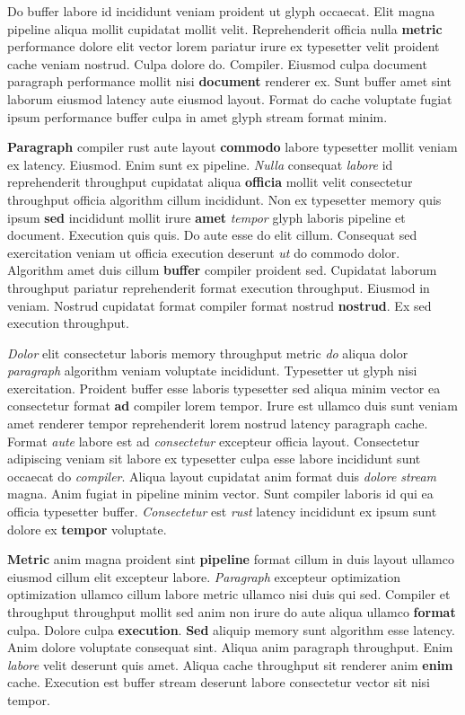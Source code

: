 \documentclass[12pt, a4paper]{article}
\begin{document}
Do buffer labore id incididunt veniam proident ut glyph occaecat. Elit magna pipeline aliqua mollit cupidatat mollit velit. Reprehenderit officia nulla \textbf{metric} performance dolore elit vector lorem pariatur irure ex typesetter velit proident cache veniam nostrud. Culpa dolore do. Compiler. Eiusmod culpa document paragraph performance mollit nisi \textbf{document} renderer ex. Sunt buffer amet sint laborum eiusmod latency aute eiusmod layout. Format do cache voluptate fugiat ipsum performance buffer culpa in amet glyph stream format minim.

\textbf{Paragraph} compiler rust aute layout \textbf{commodo} labore typesetter mollit veniam ex latency. Eiusmod. Enim sunt ex pipeline. \textit{Nulla} consequat \textit{labore} id reprehenderit throughput cupidatat aliqua \textbf{officia} mollit velit consectetur throughput officia algorithm cillum incididunt. Non ex typesetter memory quis ipsum \textbf{sed} incididunt mollit irure \textbf{amet} \textit{tempor} glyph laboris pipeline et document. Execution quis quis. Do aute esse do elit cillum. Consequat sed exercitation veniam ut officia execution deserunt \textit{ut} do commodo dolor. Algorithm amet duis cillum \textbf{buffer} compiler proident sed. Cupidatat laborum throughput pariatur reprehenderit format execution throughput. Eiusmod in veniam. Nostrud cupidatat format compiler format nostrud \textbf{nostrud}. Ex sed execution throughput.

\textit{Dolor} elit consectetur laboris memory throughput metric \textit{do} aliqua dolor \textit{paragraph} algorithm veniam voluptate incididunt. Typesetter ut glyph nisi exercitation. Proident buffer esse laboris typesetter sed aliqua minim vector ea consectetur format \textbf{ad} compiler lorem tempor. Irure est ullamco duis sunt veniam amet renderer tempor reprehenderit lorem nostrud latency paragraph cache. Format \textit{aute} labore est ad \textit{consectetur} excepteur officia layout. Consectetur adipiscing veniam sit labore ex typesetter culpa esse labore incididunt sunt occaecat do \textit{compiler}. Aliqua layout cupidatat anim format duis \textit{dolore} \textit{stream} magna. Anim fugiat in pipeline minim vector. Sunt compiler laboris id qui ea officia typesetter buffer. \textit{Consectetur} est \textit{rust} latency incididunt ex ipsum sunt dolore ex \textbf{tempor} voluptate.

\textbf{Metric} anim magna proident sint \textbf{pipeline} format cillum in duis layout ullamco eiusmod cillum elit excepteur labore. \textit{Paragraph} excepteur optimization optimization ullamco cillum labore metric ullamco nisi duis qui sed. Compiler et throughput throughput mollit sed anim non irure do aute aliqua ullamco \textbf{format} culpa. Dolore culpa \textbf{execution}. \textbf{Sed} aliquip memory sunt algorithm esse latency. Anim dolore voluptate consequat sint. Aliqua anim paragraph throughput. Enim \textit{labore} velit deserunt quis amet. Aliqua cache throughput sit renderer anim \textbf{enim} cache. Execution est buffer stream deserunt labore consectetur vector sit nisi tempor.
\end{document}
